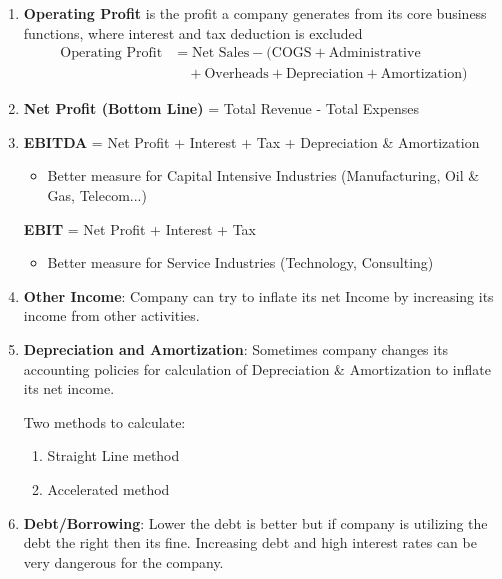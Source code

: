 \documentclass[12pt]{article}
\begin{document}
\begin{enumerate}
    \item \textbf{Operating Profit} is the profit a company generates from its core business functions, where interest and tax deduction is excluded
    \begin{align}
    \text{Operating Profit} &= \text{Net Sales} - (\text{COGS} + \text{Administrative} \\
    &\quad + \text{Overheads} + \text{Depreciation} + \text{Amortization})
    \end{align}
    
    \item \textbf{Net Profit (Bottom Line)} = Total Revenue - Total Expenses
    
    \item \textbf{EBITDA} = Net Profit + Interest + Tax + Depreciation \& Amortization
    \begin{itemize}
      \item Better measure for Capital Intensive Industries (Manufacturing, Oil \& Gas, Telecom...)
    \end{itemize}
    \textbf{EBIT} = Net Profit + Interest + Tax
    \begin{itemize}
        \item Better measure for Service Industries (Technology, Consulting)
    \end{itemize}
    
    \item \textbf{Other Income}: Company can try to inflate its net Income by increasing its income from other activities.
    
    \item \textbf{Depreciation and Amortization}: Sometimes company changes its accounting policies for calculation of Depreciation \& Amortization to inflate its net income.
    
    Two methods to calculate:
    \begin{enumerate}[label=(\roman*)]
        \item Straight Line method
        \item Accelerated method
    \end{enumerate}
    
    \item \textbf{Debt/Borrowing}: Lower the debt is better but if company is utilizing the debt the right then its fine. Increasing debt and high interest rates can be very dangerous for the company.
    

\end{enumerate}
\end{document}
